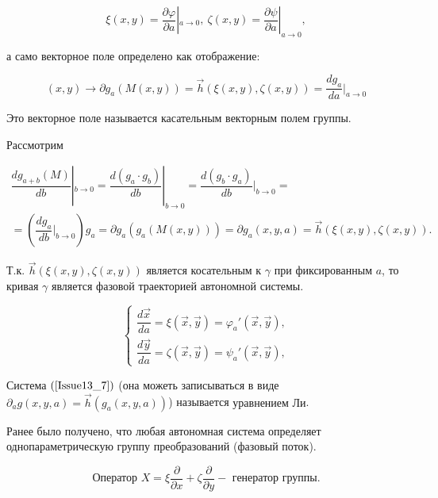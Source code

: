 \[ \xi(x,y) = \dfrac{\partial \varphi}{\partial a}|_{a \rightarrow 0},\ \zeta(x,y) = \dfrac{\partial \psi }{\partial a}|_{a \rightarrow 0}, \]

а само векторное поле определено как отображение:

\begin{equation}
	(x,y) \rightarrow \partial g_a(M(x,y)) = \vec{h}(\xi(x,y), \zeta(x,y)) = \dfrac{dg_a}{da}|_{a \rightarrow 0}
	\label{Issue13_6}
\end{equation}

Это векторное поле называется $\textbf{касательным векторным полем}$ группы.

Рассмотрим 

\begin{equation}
	\begin{gathered}
		\dfrac{dg_{a+b}(M)}{db}|_{b\rightarrow 0} = \dfrac{d(g_a\cdot g_b)}{db}|_{b\rightarrow0} = \dfrac{d(g_b\cdot g_a)}{db}|_{b\rightarrow 0} = \\
		= (\dfrac{dg_a}{db}|_{b\rightarrow 0})g_a = \partial g_a (g_a(M(x,y))) = \partial g_a (x,y,a) = \vec{h}(\xi(x,y), \zeta(x,y)).
	\end{gathered}
\end{equation}

Т.к. $\vec{h}(\xi(x,y), \zeta(x,y))$ является косательным к $\gamma$ при фиксированным $a$, то кривая $\gamma$ является $\textbf{фазовой траекторией}$ автономной системы.

\begin{equation}
	\begin{cases}
		\dfrac{d\vec{x}}{da} = \xi(\vec{x}, \vec{y}) = \varphi_a'(\vec{x}, \vec{y}), \\
		\dfrac{d\vec{y}}{da} = \zeta(\vec{x}, \vec{y}) = \psi_a'(\vec{x}, \vec{y}),		
	\end{cases}
	\label{Issue13_7}
\end{equation}

Система $(\ref{Issue13_7})$ (она можеть записываться в виде $\partial_a g(x,y,a) = \vec{h}(g_a(x,y,a))$) называется $\textbf{уравнением Ли}$.

Ранее было получено, что любая автономная система определяет однопараметрическую группу преобразований (фазовый поток).


\begin{equation}
\text{Оператор } X = \xi \dfrac{\partial}{\partial x} + \zeta \dfrac{\partial}{\partial y} - \text{ генератор группы.}
\label{Issue13_8}
\end{equation}

